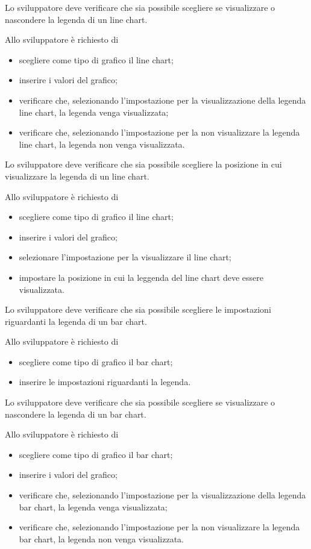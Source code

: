 	Lo sviluppatore deve verificare che sia possibile scegliere se visualizzare o nascondere la legenda di un line chart.
			
		Allo sviluppatore è richiesto di
		\begin{itemize}
			\item scegliere come tipo di grafico il line chart;
			\item inserire i valori del grafico;
			\item verificare che, selezionando l'impostazione per la visualizzazione della legenda line chart, la legenda venga visualizzata;
			\item verificare che, selezionando l'impostazione per la non visualizzare la legenda line chart, la legenda non venga visualizzata.
		\end{itemize}

	Lo sviluppatore deve verificare che sia possibile scegliere la posizione in cui visualizzare la legenda di un line chart.
			
		Allo sviluppatore è richiesto di
		\begin{itemize}
			\item scegliere come tipo di grafico il line chart;
			\item inserire i valori del grafico;
			\item selezionare l'impostazione per la visualizzare il line chart;
			\item impostare la posizione in cui la leggenda del line chart deve essere visualizzata.

		\end{itemize}

	Lo sviluppatore deve verificare che sia possibile scegliere le impostazioni riguardanti la legenda di un bar chart.

		Allo sviluppatore è richiesto di
		\begin{itemize}
			\item scegliere come tipo di grafico il bar chart;
			\item inserire le impostazioni riguardanti la legenda.
		\end{itemize}

	Lo sviluppatore deve verificare che sia possibile scegliere se visualizzare o nascondere la legenda di un bar chart.
		
		Allo sviluppatore è richiesto di
		\begin{itemize}
			\item scegliere come tipo di grafico il bar chart;
			\item inserire i valori del grafico;
			\item verificare che, selezionando l'impostazione per la visualizzazione della legenda bar chart, la legenda venga visualizzata;
			\item verificare che, selezionando l'impostazione per la non visualizzare la legenda bar chart, la legenda non venga visualizzata.
		\end{itemize}

